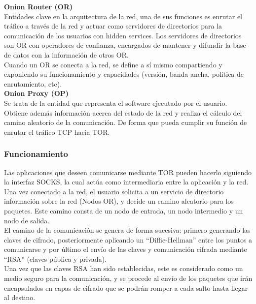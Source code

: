 \textbf {Onion Router (OR)} \\
Entidades clave en la arquitectura de la red, una de sus funciones es enrutar el tráfico a través de la red y actuar como servidores de directorios para la comunicación de los usuarios con hidden services. Los servidores de directorios son OR con operadores de confianza, encargados de mantener y difundir la base de datos con la información de otros OR. \\

Cuando un OR se conecta a la red, se define a sí mismo compartiendo y exponiendo su funcionamiento y capacidades (versión, banda ancha, política de enrutamiento, etc). \\

\textbf {Onion Proxy (OP)} \\
Se trata de la entidad que representa el software ejecutado por el usuario. Obtiene además información acerca del estado de la red y realiza el cálculo del camino aleatorio de la comunicación. De forma que pueda cumplir su función de enrutar el tráfico TCP hacia TOR.

\subsubsection {Funcionamiento}

Las aplicaciones que deseen comunicarse mediante TOR pueden hacerlo siguiendo la interfaz SOCKS, la cual actúa como intermediaria entre la aplicación y la red. \\

Una vez conectado a la red, el usuario solicita a un servicio de directorio información sobre la red (Nodos OR), y decide un camino aleatorio para los paquetes. Este camino consta de un nodo de entrada, un nodo intermedio y un nodo de salida. \\

El camino de la comunicación se genera de forma sucesiva: primero generando las claves de cifrado, posteriormente aplicando un \hyphenquote{spanish}{Diffie-Hellman} entre los puntos a comunicarse y por último el envío de las claves y comunicación cifrada mediante \hyphenquote{spanish}{RSA} (claves pública y privada). \\


Una vez que las claves RSA han sido establecidas, este es considerado como un medio seguro para la comunicación, y se procede al envío de los paquetes que irán encapsulados en capas de cifrado que se podrán romper a cada salto hasta llegar al destino. \\ 

